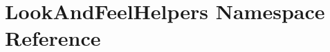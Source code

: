 \hypertarget{namespace_look_and_feel_helpers}{}\section{Look\+And\+Feel\+Helpers Namespace Reference}
\label{namespace_look_and_feel_helpers}
